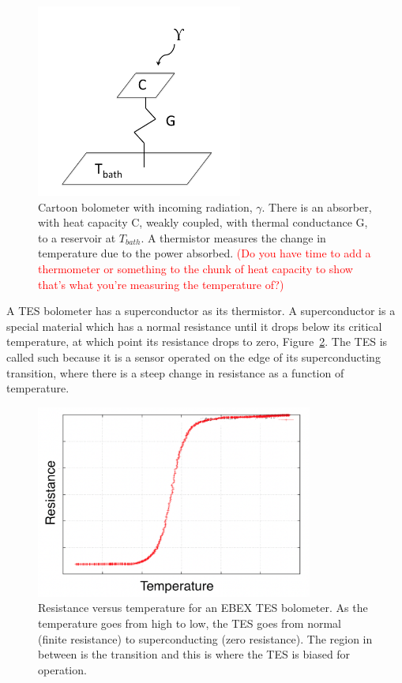\begin{figure}[htp]
\begin{center}
\includegraphics[height=2.5in]{figures/bolometer_cartoon}
\caption{Cartoon bolometer with incoming radiation, $\gamma$. There is an absorber, with heat capacity C, weakly coupled, with thermal conductance G, to a reservoir at $T_{bath}$. A thermistor measures the change in temperature due to the power absorbed. 
\textcolor{red}{(Do you have time to add a thermometer or something to the chunk of heat capacity to show that's what you're measuring the temperature of?)}
\label{fig:bolometer_cartoon} }
\end{center}
\end{figure}

A \ac{TES} bolometer has a superconductor as its thermistor. 
A superconductor is a special material which has a normal resistance until it drops below its critical temperature, at which point its resistance drops to zero, Figure~\ref{fig:r_vs_t}. 
The \ac{TES} is called such because it is a sensor operated on the edge of its superconducting transition, where there is a steep change in resistance as a function of temperature. 

\begin{figure}[htp]
\begin{center}
\includegraphics[height=2.5in]{figures/RvsT_for_thesis.png}
\caption{Resistance versus temperature for an \ac{EBEX} \ac{TES} bolometer. As the temperature goes from high to low, the \ac{TES} goes from normal (finite resistance) to superconducting (zero resistance). The region in between is the transition and this is where the \ac{TES} is biased for operation. 
\label{fig:r_vs_t} }
\end{center}
\end{figure}

